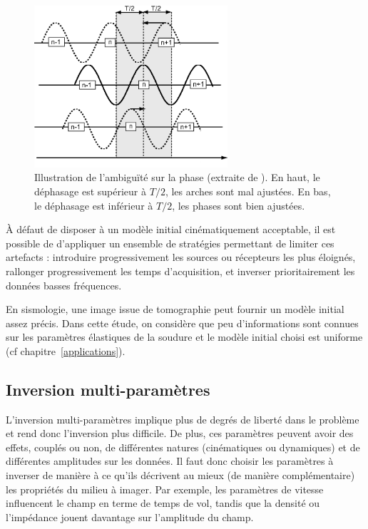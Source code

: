\begin{figure}[!h]
	\centering
	\includegraphics[height=6cm]{img/ambig_phase.png}
	\caption{Illustration de l'ambiguïté sur la phase (extraite de \cite{brossier_these}). En haut, le déphasage est supérieur à $T/2$, les arches sont mal ajustées. En bas, le déphasage est inférieur à $T/2$, les phases sont bien ajustées. \label{ambig_phase}}
\end{figure}

À défaut de disposer à un modèle initial cinématiquement acceptable, il est possible de d'appliquer un ensemble de stratégies permettant de limiter ces artefacts : introduire progressivement les sources ou récepteurs les plus éloignés, rallonger progressivement les temps d'acquisition, et inverser prioritairement les données basses fréquences.


En sismologie, une image issue de tomographie peut fournir un modèle initial assez précis. Dans cette étude, on considère que peu d'informations sont connues sur les paramètres élastiques de la soudure et le modèle initial choisi est uniforme (cf chapitre~\ref{applications}).


\subsection{Inversion multi-paramètres}
L'inversion multi-paramètres implique plus de degrés de liberté dans le problème et rend donc l'inversion plus difficile. De plus, ces paramètres peuvent avoir des effets, couplés ou non, de différentes natures (cinématiques ou dynamiques) et de différentes amplitudes sur les données. Il faut donc choisir les paramètres à inverser de manière à ce qu'ils décrivent au mieux (de manière complémentaire) les propriétés du milieu à imager. Par exemple, les paramètres de vitesse influencent le champ en terme de temps de vol, tandis que la densité ou l'impédance jouent davantage sur l'amplitude du champ.\\


